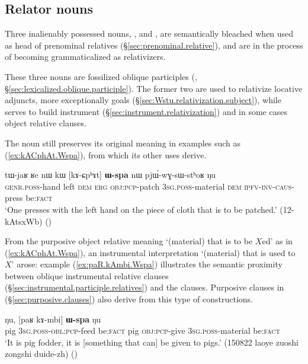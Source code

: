 \subsection{Relator nouns} \label{sec:Wspa.relative}  
Three inalienably possessed nouns, ,   and , are semantically bleached when used as head of prenominal relatives (§\ref{sec:prenominal.relative}), and are in the process of becoming grammaticalized as relativizers. 

These three nouns are fossilized oblique participles (, §\ref{sec:lexicalized.oblique.participle}). The former two are used to relativize locative adjuncts, more exceptionally goals (§\ref{sec:Wstu.relativization.subject}), while   serves to build  instrument (§\ref{sec:instrument.relativization}) and in some cases object relative clauses.
 
The noun  still preserves its original meaning in examples such as (\ref{ex:kACphAt.Wspa}), from which its other uses derive.
 
\begin{exe}
\ex \label{ex:kACphAt.Wspa} 
\gll tɯ-jaʁ ʁe nɯ kɯ [kɤ-ɕpʰɤt] \textbf{ɯ-spa} nɯ pjɯ́-wɣ-sɯ-stʰoʁ ŋu \\
\textsc{genr}.\textsc{poss}-hand left \textsc{dem} \textsc{erg} \textsc{obj}:\textsc{pcp}-patch \textsc{3sg}.\textsc{poss}-material \textsc{dem} \textsc{ipfv}-\textsc{inv}-\textsc{caus}-press be:\textsc{fact} \\
\glt `One presses with the left hand on the piece of cloth that is to be patched.' (12-kAtsxWb)
()
\end{exe}

From the purposive object relative meaning `(material) that is to be $X$ed' as in (\ref{ex:kACphAt.Wspa}), an instrumental interpretation `(material) that is used to $X$' arose: example (\ref{ex:paR.kAmbi.Wspa}) illustrates the semantic proximity between oblique instrumental relative clauses (§\ref{sec:instrumental.participle.relatives}) and the  clauses. Purposive clauses in  (§\ref{sec:purposive.clauses}) also derive from this type of constructions.

\begin{exe}
\ex \label{ex:paR.kAmbi.Wspa} 
 ŋu, [paʁ kɤ-mbi] \textbf{ɯ-spa} ŋu \\
pig \textsc{3sg}.\textsc{poss}-\textsc{obl}:\textsc{pcp}-feed be:\textsc{fact} pig \textsc{obj}:\textsc{pcp}-give \textsc{3sg}.\textsc{poss}-material be:\textsc{fact} \\
\glt `It is pig fodder, it is [something that can] be given to pigs.' (150822 laoye zuoshi zongshi duide-zh)
()
\end{exe}  

